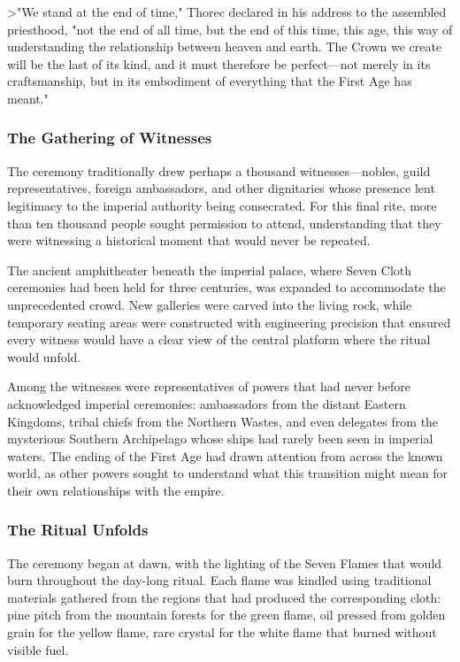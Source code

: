 \textgreater"We stand at the end of time," Thorec declared in his
address to the assembled priesthood, "not the end of all time, but the
end of this time, this age, this way of understanding the relationship
between heaven and earth. The Crown we create will be the last of its
kind, and it must therefore be perfect---not merely in its
craftsmanship, but in its embodiment of everything that the First Age
has meant."

\subsubsection{The Gathering of
Witnesses}\label{the-gathering-of-witnesses}

The ceremony traditionally drew perhaps a thousand witnesses---nobles,
guild representatives, foreign ambassadors, and other dignitaries whose
presence lent legitimacy to the imperial authority being consecrated.
For this final rite, more than ten thousand people sought permission to
attend, understanding that they were witnessing a historical moment that
would never be repeated.

The ancient amphitheater beneath the imperial palace, where Seven Cloth
ceremonies had been held for three centuries, was expanded to
accommodate the unprecedented crowd. New galleries were carved into the
living rock, while temporary seating areas were constructed with
engineering precision that ensured every witness would have a clear view
of the central platform where the ritual would unfold.

Among the witnesses were representatives of powers that had never before
acknowledged imperial ceremonies: ambassadors from the distant Eastern
Kingdoms, tribal chiefs from the Northern Wastes, and even delegates
from the mysterious Southern Archipelago whose ships had rarely been
seen in imperial waters. The ending of the First Age had drawn attention
from across the known world, as other powers sought to understand what
this transition might mean for their own relationships with the empire.

\subsubsection{The Ritual Unfolds}\label{the-ritual-unfolds}

The ceremony began at dawn, with the lighting of the Seven Flames that
would burn throughout the day-long ritual. Each flame was kindled using
traditional materials gathered from the regions that had produced the
corresponding cloth: pine pitch from the mountain forests for the green
flame, oil pressed from golden grain for the yellow flame, rare crystal
for the white flame that burned without visible fuel.

